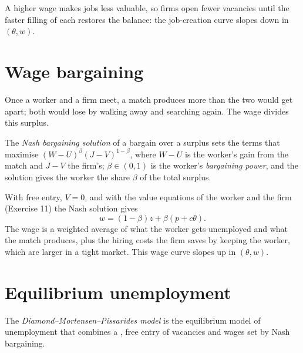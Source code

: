 A higher wage makes jobs less valuable, so firms open fewer vacancies until the faster filling of each restores the
balance: the job-creation curve slopes down in $(\theta, w)$.

\section{Wage bargaining}\label{sec:b2:search-and-unemployment:bargaining}

Once a worker and a firm meet, a match produces more than the two would get apart; both would lose by walking away and
searching again. The wage divides this surplus.

\begin{definition}\label{def:b2:search-and-unemployment:nash-bargaining}
The \emph{Nash bargaining solution} of a bargain over a surplus sets the terms that
maximise $(W - U)^\beta(J - V)^{1-\beta}$, where $W - U$ is the worker's gain from the match and $J - V$ the firm's; $\beta \in (0, 1)$ is the worker's \emph{bargaining power},
and the solution gives the worker the share $\beta$ of the total surplus.
\end{definition}

With free entry, $V = 0$, and with the value equations of the worker and the firm (Exercise 11) the Nash solution gives
\begin{equation}\label{eq:b2:search-and-unemployment:wage}
w = (1 - \beta)z + \beta(p + c\theta).
\end{equation}
The wage is a weighted average of what the worker gets unemployed and what the match produces, plus the hiring costs
the firm saves by keeping the worker, which are larger in a tight market. This wage curve slopes up in $(\theta, w)$.

\section{Equilibrium unemployment}\label{sec:b2:search-and-unemployment:dmp}

\begin{definition}\label{def:b2:search-and-unemployment:dmp}
The \emph{Diamond--Mortensen--Pissarides model} is the equilibrium model of
unemployment that combines a , free entry of vacancies and wages set by Nash bargaining.
\end{definition}

